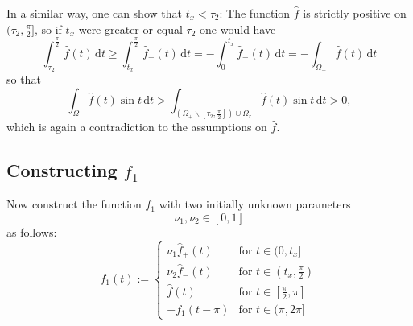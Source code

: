 \documentclass{article}
\newcommand{\dt}{\,\mathrm{d}t}
\begin{document}
In a similar way, one can show that $t_x < \tau_2$: The function $\hat f$ is strictly positive on $(\tau_2, \frac{\pi}{2}]$, so if $t_x$ were greater or equal $\tau_2$ one would have
\begin{equation*}
    \int_{\tau_2}^\frac{\pi}{2} \hat f(t) \dt \ge \int_{t_x}^\frac{\pi}{2} \hat f_+(t) \dt = -\int_0^{t_x} \hat f_-(t) \dt = -\int_{\Omega_-} \hat f(t) \dt
\end{equation*} 
so that
\[\int_\Omega \hat f(t) \sin t \dt >  \int_{(\Omega_+\backslash[\tau_2, \frac\pi 2])\cup\Omega_r} \hat f(t) \sin t \dt > 0,\]
which is again a contradiction to the assumptions on $\hat f$.

\subsection{Constructing $f_1$}

Now construct the function $f_1$ with two initially unknown parameters
\[\nu_1, \nu_2 \in [0,1]\]
as follows:
\begin{equation} \label{eq:def_f1_new}
    f_1(t) := 
    \begin{cases}    
        \nu_1 \hat f_+(t) & \text{for } t \in (0, t_x] \\[10pt]
        \nu_2 \hat f_-(t) & \text{for } t \in (t_x, \frac{\pi}{2}) \\[10pt]
        \hat f(t) & \text{for } t \in [\frac{\pi}{2}, \pi] \\[10pt]
        -f_1(t-\pi) & \text{for } t \in (\pi, 2\pi]
    \end{cases}
\end{equation}
\end{document}
